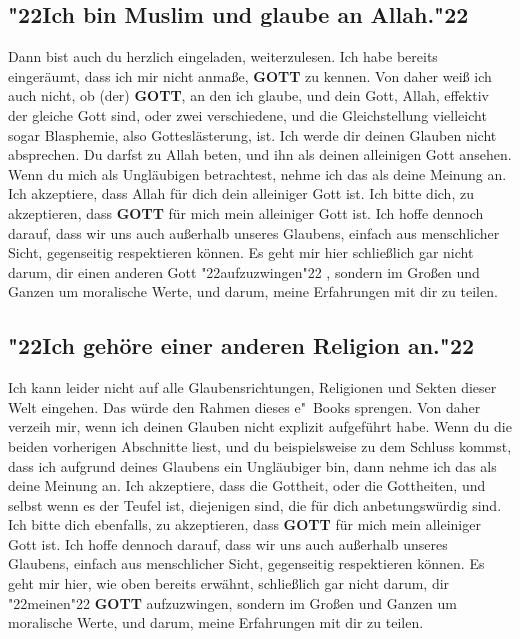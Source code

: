 \documentclass[10pt,a5paper]{article}
\newcommand{\Gott}[0]{\textbf{GOTT}}
\newcommand{\q}[1]{\char"22{#1}\char"22 }
\begin{document}
	\subsection{\q{Ich bin Muslim und glaube an Allah.}}
		Dann bist auch du herzlich eingeladen,
		weiterzulesen.
		Ich habe bereits einger\"aumt,
		dass ich mir nicht anma{\ss}e,
		{\Gott} zu kennen.
		Von daher wei{\ss} ich auch nicht,
		ob (der) {\Gott},
		an den ich glaube,
		und dein Gott,
		Allah,
		effektiv der gleiche Gott sind,
		oder zwei verschiedene,
		und die Gleichstellung vielleicht sogar Blasphemie,
		also Gottesl\"asterung,
		ist.
		Ich werde dir deinen Glauben nicht absprechen.
		Du darfst zu Allah beten,
		und ihn als deinen alleinigen Gott ansehen.
		Wenn du mich als Ungl\"aubigen betrachtest,
		nehme ich das als deine Meinung an.
		Ich akzeptiere,
		dass Allah f\"ur dich dein alleiniger Gott ist.
		Ich bitte dich,
		zu akzeptieren,
		dass {\Gott} f\"ur mich mein alleiniger Gott ist.
		Ich hoffe dennoch darauf,
		dass wir uns auch au{\ss}erhalb unseres Glaubens,
		einfach aus menschlicher Sicht,
		gegenseitig respektieren k\"onnen.
		Es geht mir hier schlie{\ss}lich gar nicht darum,
		dir einen anderen Gott \q{aufzuzwingen},
		sondern im Gro{\ss}en und Ganzen um moralische Werte,
		und darum,
		meine Erfahrungen mit dir zu teilen.
		
	\subsection{\q{Ich geh\"ore einer anderen Religion an.}}
		Ich kann leider nicht auf alle Glaubensrichtungen,
		Religionen und Sekten dieser Welt eingehen.
		Das w\"urde den Rahmen dieses e"~Books sprengen.
		Von daher verzeih mir,
		wenn ich deinen Glauben nicht explizit aufgef\"uhrt habe.
		Wenn du die beiden vorherigen Abschnitte liest,
		und du beispielsweise zu dem Schluss kommst,
		dass ich aufgrund deines Glaubens ein Ungl\"aubiger bin,
		dann nehme ich das als deine Meinung an.
		Ich akzeptiere,
		dass die Gottheit,
		oder die Gottheiten,
		und selbst wenn es der Teufel ist,
		diejenigen sind,
		die f\"ur dich anbetungsw\"urdig sind.
		Ich bitte dich ebenfalls,
		zu akzeptieren,
		dass {\Gott} f\"ur mich mein alleiniger Gott ist.
		Ich hoffe dennoch darauf,
		dass wir uns auch au{\ss}erhalb unseres Glaubens,
		einfach aus menschlicher Sicht,
		gegenseitig respektieren k\"onnen.
		Es geht mir hier,
		wie oben bereits erw\"ahnt,
		schlie{\ss}lich gar nicht darum,
		dir \q{meinen} {\Gott} aufzuzwingen,
		sondern im Gro{\ss}en und Ganzen um moralische Werte,
		und darum,
		meine Erfahrungen mit dir zu teilen.
	
\end{document}

